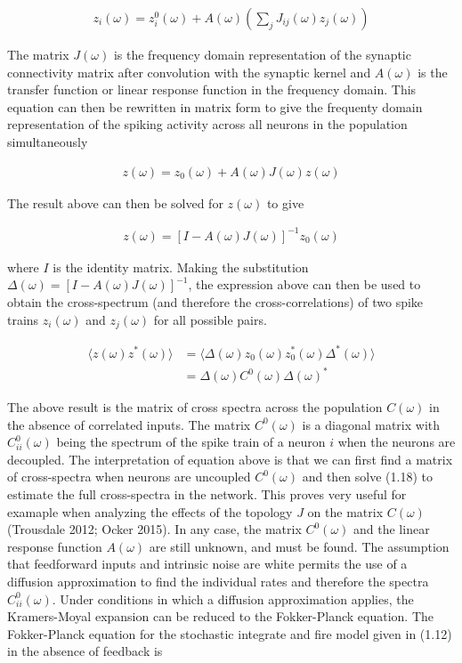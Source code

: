 \documentclass{ucetd}
\begin{document}
\begin{align}
z_{i}(\omega) = z_{i}^{0}(\omega) + A(\omega)\left(\sum_{j}J_{ij}(\omega)z_{j}(\omega)\right)
\end{align}

The matrix $J(\omega)$ is the frequency domain representation of the synaptic connectivity matrix after convolution with the synaptic kernel and $A(\omega)$ is the transfer function or linear response function in the frequency domain. This equation can then be rewritten in matrix form to give the frequenty domain representation of the spiking activity across all neurons in the population simultaneously

\begin{align}
z(\omega) = z_{0}(\omega) + A(\omega)J(\omega)z(\omega)
\end{align}

The result above can then be solved for $z(\omega)$ to give 


\begin{align}
z(\omega) = \left[I-A(\omega)J(\omega)\right]^{-1}z_{0}(\omega)
\end{align}

where $I$ is the identity matrix. Making the substitution $\Delta(\omega) = \left[I-A(\omega)J(\omega)\right]^{-1}$, the expression above can then be used to obtain the cross-spectrum (and therefore the cross-correlations) of two spike trains $z_{i}(\omega)$ and $z_{j}(\omega)$ for all possible pairs. 

\begin{align}
\langle z(\omega)z^{*}(\omega)\rangle &= \langle \Delta(\omega)z_{0}(\omega)z_{0}^{*}(\omega)\Delta^{*}(\omega)\rangle\\
&= \Delta(\omega)C^{0}(\omega)\Delta(\omega)^{*}
\end{align}

The above result is the matrix of cross spectra across the population $C(\omega)$ in the absence of correlated inputs. The matrix $C^{0}(\omega)$ is a diagonal matrix with $C_{ii}^{0}(\omega)$ being the spectrum of the spike train of a neuron $i$ when the neurons are decoupled. The interpretation of equation above is that we can first find a matrix of cross-spectra when neurons are uncoupled $C^{0}(\omega)$ and then solve (1.18) to estimate the full cross-spectra in the network. This proves very useful for examaple when analyzing the effects of the topology $J$ on the matrix $C(\omega)$ (Trousdale 2012; Ocker 2015). In any case, the matrix $C^{0}(\omega)$ and the linear response function $A(\omega)$ are still unknown, and must be found. The assumption that feedforward inputs and intrinsic noise are white permits the use of a diffusion approximation to find the individual rates and therefore the spectra $C_{ii}^{0}(\omega)$. Under conditions in which a diffusion approximation applies, the Kramers-Moyal expansion can be reduced to the Fokker-Planck equation. The Fokker-Planck equation for the stochastic integrate and fire model given in (1.12) in the absence of feedback is
\end{document}
